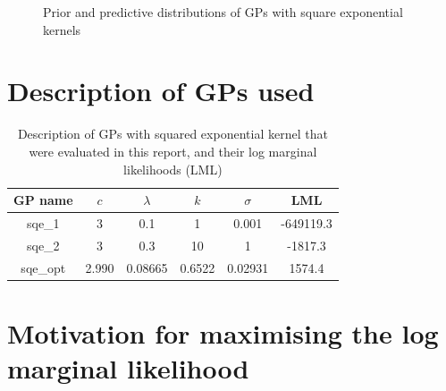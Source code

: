 \documentclass{article}
\begin{document}
\begin{figure}[pht]
    \caption{Prior and predictive distributions of GPs with square exponential kernels}
    \label{fig:sqe}
\end{figure}


\section{Description of GPs used}\label{appendix:gp_table}


\begin{table}[ht]
\centering
\begin{tabular}{|c|c|c|c|c|c|}
\hline
GP name  & $c$   & $\lambda$ & $k$    & $\sigma$ & LML       \\
\hline
sqe\_1   & 3     & 0.1       & 1      & 0.001    & -649119.3 \\
sqe\_2   & 3     & 0.3       & 10     & 1        & -1817.3   \\
sqe\_opt & 2.990 & 0.08665   & 0.6522 & 0.02931  & 1574.4    \\
\hline
\end{tabular}
\caption{Description of GPs with squared exponential kernel that were evaluated in this report, and their log marginal likelihoods (LML)}
\label{table:sqe_table}
\end{table}


\section{Motivation for maximising the log marginal likelihood}\label{appendix:why_lml}




\end{document}
